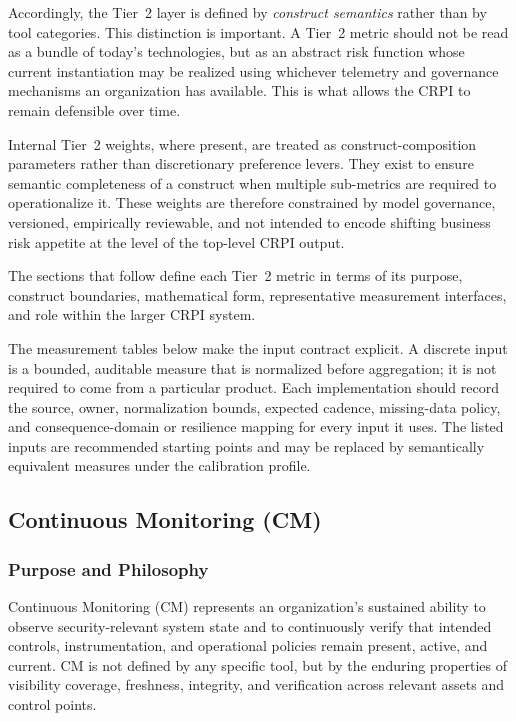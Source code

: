 \documentclass[11pt]{article}
\begin{document}
Accordingly, the Tier~2 layer is defined by \emph{construct semantics} rather than by
tool categories. This distinction is important. A Tier~2 metric should not be read as a
bundle of today's technologies, but as an abstract risk function whose current
instantiation may be realized using whichever telemetry and governance mechanisms an
organization has available. This is what allows the CRPI to remain defensible over time.

Internal Tier~2 weights, where present, are treated as construct-composition parameters
rather than discretionary preference levers. They exist to ensure semantic completeness
of a construct when multiple sub-metrics are required to operationalize it. These
weights are therefore constrained by model governance, versioned, empirically
reviewable, and not intended to encode shifting business risk appetite at the level of
the top-level CRPI output.

The sections that follow define each Tier~2 metric in terms of its purpose, construct
boundaries, mathematical form, representative measurement interfaces, and role within
the larger CRPI system.

The measurement tables below make the input contract explicit. A discrete input is a
bounded, auditable measure that is normalized before aggregation; it is not required to
come from a particular product. Each implementation should record the source, owner,
normalization bounds, expected cadence, missing-data policy, and consequence-domain or
resilience mapping for every input it uses. The listed inputs are recommended starting
points and may be replaced by semantically equivalent measures under the calibration
profile.

\subsection{Continuous Monitoring (CM)}
\subsubsection{Purpose and Philosophy}
Continuous Monitoring (CM) represents an organization’s sustained ability to observe
security-relevant system state and to continuously verify that intended controls,
instrumentation, and operational policies remain present, active, and current. CM is
not defined by any specific tool, but by the enduring properties of visibility
coverage, freshness, integrity, and verification across relevant assets and control
points.
\end{document}
